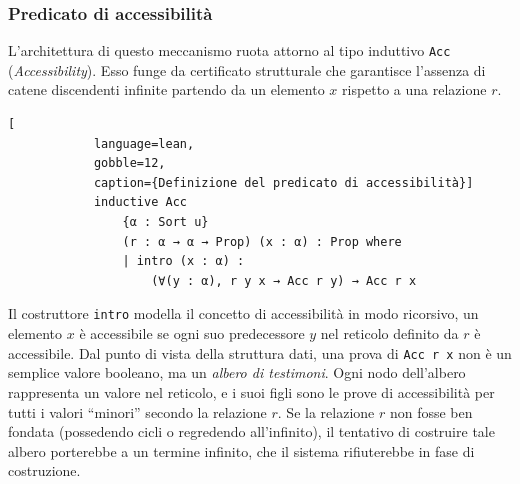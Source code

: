 \subsubsection{Predicato di accessibilità}
L'architettura di questo meccanismo ruota attorno al tipo induttivo \texttt{Acc} (\textit{Accessibility}). Esso funge da certificato strutturale che 
garantisce l'assenza di catene discendenti infinite partendo da un elemento $x$ rispetto a una relazione $r$.
\begin{center}
    \begin{minipage}{0.85\textwidth}
        \begin{lstlisting}[
            language=lean, 
            gobble=12,
            caption={Definizione del predicato di accessibilità}]
            inductive Acc 
                {α : Sort u} 
                (r : α → α → Prop) (x : α) : Prop where
                | intro (x : α) : 
                    (∀(y : α), r y x → Acc r y) → Acc r x
        \end{lstlisting}
    \end{minipage}
\end{center}
Il costruttore \texttt{intro} modella il concetto di accessibilità in modo ricorsivo, un elemento $x$ è accessibile se ogni suo predecessore $y$ nel reticolo definito 
da $r$ è accessibile. Dal punto di vista della struttura dati, una prova di \texttt{Acc r x} non è un semplice valore booleano, ma un \emph{albero di testimoni}. Ogni 
nodo dell'albero rappresenta un valore nel reticolo, e i suoi figli sono le prove di accessibilità per tutti i valori ``minori'' secondo la relazione $r$. Se la relazione 
$r$ non fosse ben fondata (possedendo cicli o regredendo all'infinito), il tentativo di costruire tale albero porterebbe a un termine infinito, che il sistema rifiuterebbe 
in fase di costruzione.

